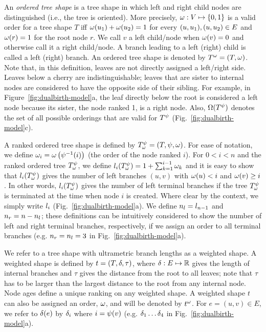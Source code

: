 An \textit{ordered tree shape} is a tree shape in which left and right child nodes are distinguished (i.e., the tree is oriented). More precisely, $\omega:V\mapsto\{0,1\}$  is a valid order for a tree shape $T$ iff $\omega(u_{1})+\omega(u_{2})=1$ for every $(u,u_{1}),(u,u_{2})\in E$ and $\omega(r)=1$ for the root node $r$. We call $v$ a left child/node when $\omega(v)=0$ and otherwise call it a right child/node. A branch leading to a left (right) child is called a left (right) branch. An ordered tree shape is denoted by $T^\omega=(T,\omega)$. Note that, in this definition, leaves are not directly assigned a left/right side. Leaves below a cherry are indistinguishable; leaves that are sister to internal nodes are considered to have the opposite side of their sibling. For example, in Figure~\ref{fig:dualbirth-model}a, the leaf directly below the root is considered a left node because its sister, the node ranked 1, is a right node. Also, $\Omega(T^\psi)$ denotes the set of all possible orderings that are valid for $T^\psi$ (Fig.~\ref{fig:dualbirth-model}c).

A ranked ordered tree shape is defined by $T^\psi_{\omega}=(T,\psi,\omega)$. For ease of notation, we define $\omega_i=\omega\left(\psi^{-1}(i)\right)$ (the order of the node ranked $i$). For $0<i<n$ and the ranked ordered tree $T^\psi_{\omega}$, we define $l_{i}(T^\psi_{\omega})=1+\sum_{k=1}^{i-1}\omega_k$ and it is easy to show that $l_{i}(T^\psi_{\omega})$ gives the number of left branches $(u,v)$ with $\omega(u) < i$ and $\omega(v) \geq i$. In other words, $l_{i}(T^\psi_{\omega})$ gives the number of left terminal branches if the tree $T^\psi_{\omega}$ is terminated at the time when node $i$ is created. Where clear by the context, we simply write $l_{i}$ (Fig.~\ref{fig:dualbirth-model}a). We define $n_l=l_{n-1}$ and $n_r= n-n_l$; these definitions can be intuitively considered to show the number of left and right terminal branches, respectively, if we assign an order to all terminal branches (e.g. $n_r=n_l=3$ in Fig.~\ref{fig:dualbirth-model}a).

We refer to a tree shape with ultrametric branch lengths as a weighted shape. A weighted shape is defined by $t=(T,\delta,\tau)$, where $\delta:E\mapsto\mathbb{R}$ gives the length of internal branches and $\tau$ gives the distance from the root to all leaves; note that $\tau$ has to be larger than the largest distance to the root from any internal node. Node ages define a unique ranking on any weighted shape. A weighted shape $t$ can also be assigned an order, $\omega$, and will be denoted by $t^\omega$. For $e=(u,v)\in E$, we refer to  $\delta(e)$ by $\delta_i$ where $i={\psi(v)}$ (e.g. $\delta_1\ldots\delta_4$ in Fig.~\ref{fig:dualbirth-model}a).

